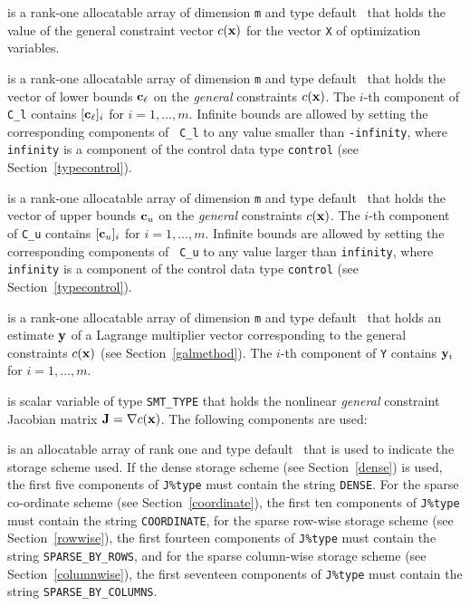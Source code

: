 \documentclass{galahad}
\newcommand{\Grad}{\nabla}
\begin{document}
\begin{description}
\begin{description}
\end{description}

 is a rank-one allocatable array of dimension {\tt m}
and type default \realdp\ that holds the value of the general
constraint vector $c({\mathbf{x}})$ for the vector {\tt X} of optimization variables. 

 is a rank-one allocatable array of dimension {\tt m}
and type default \realdp\ that holds the vector of lower bounds
${\mathbf{c}}_\ell$ on the {\em general} constraints $c({\mathbf{x}})$. The $i$-th component of
{\tt C\_l} contains $[{\mathbf{c}}_\ell]_i$ for $i = 1, \ldots , m$.  Infinite
bounds are allowed by setting the corresponding components of {\tt
  C\_l} to any value smaller than {\tt -infinity}, where {\tt
  infinity} is a component of the control data type {\tt control} (see
Section~\ref{typecontrol}).

  is a rank-one allocatable array of dimension {\tt m}
and type default \realdp\ that holds the vector of upper bounds
${\mathbf{c}}_u$ on the {\em general} constraints $c({\mathbf{x}})$. The $i$-th component of
{\tt C\_u} contains $[{\mathbf{c}}_u]_i$ for $i = 1, \ldots , m$.  Infinite
bounds are allowed by setting the corresponding components of {\tt
  C\_u} to any value larger than {\tt infinity}, where {\tt
  infinity} is a component of the control data type {\tt control} (see
Section~\ref{typecontrol}).

 is a rank-one allocatable array of dimension {\tt m} and type 
default \realdp\ that holds an estimate ${\mathbf{y}}$ of a Lagrange
multiplier vector corresponding to the general constraints $c({\mathbf{x}})$ (see Section~\ref{galmethod}).
The $i$-th component of {\tt Y} contains ${\mathbf{y}}_{i}$ for $i = 1,  \ldots , m$.


 is scalar variable of type {\tt SMT\_TYPE} that holds the
nonlinear {\em general} constraint Jacobian matrix $\bmJ = \Grad c(\bmx)$. The
following components are used:

\begin{description}

 is an allocatable array of rank one and type default 
\character\ that
is used to indicate the storage scheme used. If the dense storage scheme 
(see Section~\ref{dense}) is used, 
the first five components of {\tt J\%type} must contain the
string {\tt DENSE}.
For the sparse co-ordinate scheme (see Section~\ref{coordinate}), 
the first ten components of {\tt J\%type} must contain the
string {\tt COORDINATE},  
for the sparse row-wise storage scheme (see Section~\ref{rowwise}),
the first fourteen components of {\tt J\%type} must contain the
string {\tt SPARSE\_BY\_ROWS},
and for the sparse column-wise storage scheme (see Section~\ref{columnwise}),
the first seventeen components of {\tt J\%type} must contain the
string {\tt SPARSE\_BY\_COLUMNS}.


\end{description}
\end{description}
\end{document}
